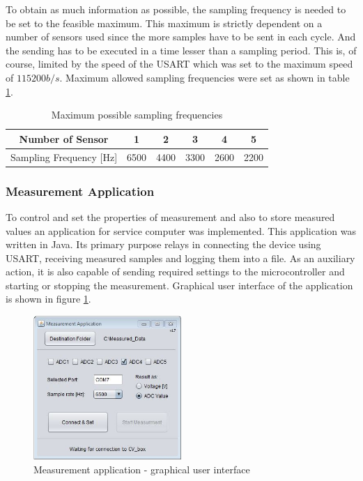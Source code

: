 \documentclass[twoside]{ctuthesis}
\theoremstyle{plain}
\theoremstyle{definition}
\theoremstyle{note}
\begin{document}
To obtain as much information as possible, the sampling frequency is needed to be set to the feasible maximum. This maximum is strictly dependent on a number of sensors used since the more samples have to be sent in each cycle. And the sending has to be executed in a time lesser than a sampling period. This is, of course, limited by the speed of the USART which was set to the maximum speed of $115200 b/s$. Maximum allowed sampling frequencies were set as shown in table \ref{tab:possibleFs}.
\begin{table}[htbp]
	\centering
	\caption{Maximum possible sampling frequencies}
	\begin{tabular}{cccccc}
		\toprule
		Number of Sensor     & 1 & 2 & 3 & 4 & 5 \\
		\midrule
		Sampling Frequency [Hz]  & 6500  & 4400   & 3300 & 2600   & 2200  \\
		
		\bottomrule
	\end{tabular}%
	\label{tab:possibleFs}%
\end{table}%

\subsubsection{Measurement Application}
To control and set the properties of measurement and also to store measured values an application for service computer was implemented. This application was written in Java. Its primary purpose relays in connecting the device using USART, receiving measured samples and logging them into a file. As an auxiliary action, it is also capable of sending required settings to the microcontroller and starting or stopping the measurement. Graphical user interface of the application is shown in figure \ref{fig:gui_APP}.
\begin{figure}[h]
	\centering
	\includegraphics[width=0.5\textwidth]{Measurement_app.JPG}
	\caption{Measurement application - graphical user interface}
	\label{fig:gui_APP}
\end{figure}
\end{document}
